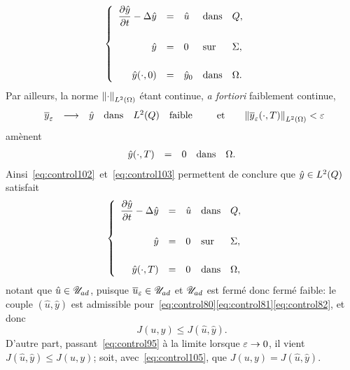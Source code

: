\ie{}
\begin{equation}\label{eq:control102}
    \begin{cases}\displaystyle
        \begin{array}{rclll}
            \dfrac{\partial{}\hat{y}}{\partial{}t} - \Delta\hat{y} & = & \hat{u} &
            \text{dans} & Q,\\
            \\
            \hat{y} & = & 0 & \text{sur} & \Sigma,\\
            \\
            {\hat{y}}\!\left({\cdot, 0}\right) & = & {\hat{y}}_{0} & \text{dans} &
            \Omega.
        \end{array}
    \end{cases}
\end{equation}
Par ailleurs, la norme ${\left\|{\cdot }\right\|}_{L^{2}\left({\Omega}\right)}$ étant continue, \textit{a
fortiori} faiblement continue,
\begin{equation*}
    \begin{array}{rcllll}
        {\overline{y}}_{\varepsilon} & \longrightarrow & \hat{y} & \text{dans} &
        L^{2}\!\left({Q}\right) &  \text{faible}
    \end{array}\qquad\text{et}\qquad
    {\left\|{ { {\overline{y}}_{\varepsilon} }\!\left({\cdot,T}\right)  }\right\|}_{L^{2}\left({\Omega}\right)} < \varepsilon
\end{equation*}
amènent
\begin{equation}\label{eq:control103}
    \begin{array}{rclll}
        {\hat{y}}\!\left({\cdot,T}\right) & = & 0 & \text{dans} & \Omega.
    \end{array}
\end{equation}
Ainsi~\eqref{eq:control102}~et~\eqref{eq:control103} permettent de conclure
que $\hat{y}\in L^{2}\!\left({Q}\right)$ satisfait
\begin{equation*}
    \begin{cases}\displaystyle
        \begin{array}{rclll}
            \dfrac{\partial{}\hat{y}}{\partial{}t} - \Delta\hat{y} & = & \hat{u} &
            \text{dans} & Q,\\
            \\
            \hat{y} & = & 0 & \text{sur} & \Sigma,\\
            \\
            {\hat{y}}\!\left({\cdot,T}\right) & = & 0 & \text{dans} & \Omega,
        \end{array}
    \end{cases}
\end{equation*}
notant que $\hat{u}\in{\mathscr{U}}_{ad}$, puisque ${\overline{u}}_{\varepsilon}\in{\mathscr{U}}_{ad}$ et ${\mathscr{U}}_{ad}$ est
fermé donc fermé faible: le couple $\left({\hat{u},\hat{y}}\right)$ est
admissible
pour~\eqref{eq:control80}\eqref{eq:control81}\eqref{eq:control82}, et donc
\begin{equation}\label{eq:control105}
    J(u,y)\leq J\!\left({\hat{u},\hat{y}}\right).
\end{equation}
D'autre part, passant~\eqref{eq:control95} à la limite lorsque $\varepsilon\to
0$, il vient $J\!\left({\hat{u},\hat{y}}\right)\leq J(u,y)$; soit,
avec~\eqref{eq:control105}, que $J(u,y) =
J\!\left({\hat{u},\hat{y}}\right)$.

